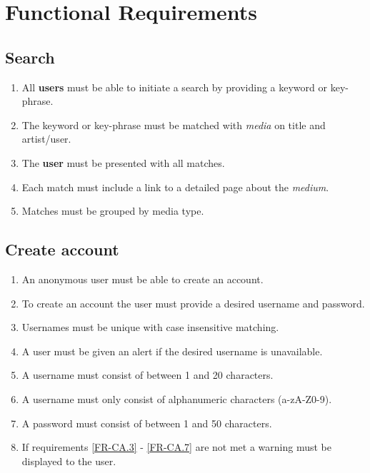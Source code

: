 \documentclass[../report.tex]{subfiles}
\begin{document}
\section{Functional Requirements}

\subsection {Search}

\begin{enumerate}[label=FR-\twodigits*]

	\item All \textbf{users} must be able to initiate a search by providing a keyword or key-phrase.
	\item The keyword or key-phrase must be matched with \textit{media} on title and artist/user.
	\item The \textbf{user} must be presented with all matches.
	\item Each match must include a link to a detailed page about the \textit{medium}.
	\item Matches must be grouped by media type. 
\end{enumerate}	
			
\subsection{Create account}

\begin{enumerate}[label=FR-\twodigits*, resume]
	\item An anonymous user must be able to create an account.
	\item To create an account the user must provide a desired username and password.
	\item Usernames must be unique with case insensitive matching. \label{FR-CA.3}
	\item A user must be given an alert if the desired username is unavailable.
	\item A username must consist of between 1 and 20 characters.
	\item A username must only consist of alphanumeric characters (a-zA-Z0-9).
	\item A password must consist of between 1 and 50 characters. \label{FR-CA.7}
	\item If requirements \ref{FR-CA.3} - \ref{FR-CA.7} are not met a warning must be displayed to the user.
\end{enumerate}
	
\end{document}
